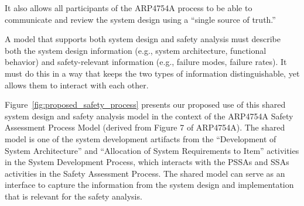 It also allows all participants of the ARP4754A process to be able to communicate and review the system design using a ``single source of truth.''

A model that supports both system design and safety analysis must describe both the system design information (e.g., system architecture, functional behavior) and safety-relevant information (e.g., failure modes, failure rates).  It must do this in a way that keeps the two types of information distinguishable, yet allows them to interact with each other.

Figure~\ref{fig:proposed_safety_process} presents our proposed use of this shared system design and safety analysis model in the context of the ARP4754A Safety Assessment Process Model (derived from Figure 7 of ARP4754A). The shared model is one of the system development artifacts from the ``Development of System Architecture'' and ``Allocation of System Requirements to Item'' activities in the System Development Process, which interacts with the PSSAs and SSAs activities in the Safety Assessment Process. The shared model can serve as an interface to capture the information from the system design and implementation that is relevant for the safety analysis.


